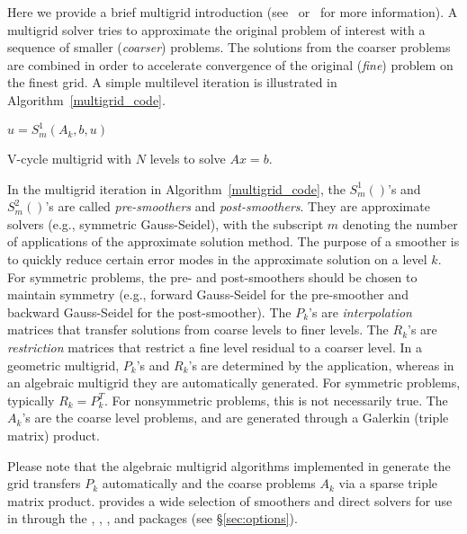 \label{sec:multigrid intro}
Here we provide a brief multigrid introduction (see~\cite{MGTutorial}
or~\cite{OwlBook} for more information). A multigrid solver tries to approximate
the original problem of interest with a sequence of smaller (\textit{coarser})
problems. The solutions from the coarser problems are combined in order to
accelerate convergence of the original (\textit{fine}) problem on the finest
grid. A simple multilevel iteration is illustrated in
Algorithm~\ref{multigrid_code}.

\begin{algorithm}
\centering
\begin{algorithmic}[0]
    \State $ u = S^{1}_m (A_k, b, u)$
        \State{}
      \EndIf
  \EndFunction
\end{algorithmic}
\caption{V-cycle multigrid with $N$ levels to solve $Ax=b$.}
\label{multigrid_code}
\end{algorithm}

In the multigrid iteration in Algorithm~\ref{multigrid_code}, the $S^{1}_m()$'s
and $S^{2}_m()$'s are called \textit{pre-smoothers} and \textit{post-smoothers}.
They are approximate solvers (e.g., symmetric Gauss-Seidel), with the subscript
$m$ denoting the number of applications of the approximate solution method. The
purpose of a smoother is to quickly reduce certain error modes in the
approximate solution on a level $k$. For symmetric problems, the pre-
and post-smoothers should be chosen to maintain symmetry (e.g., forward
Gauss-Seidel for the pre-smoother and backward Gauss-Seidel for the
post-smoother). The $P_k$'s are \textit{interpolation} matrices that transfer
solutions from coarse levels to finer levels. The $R_k$'s are
\textit{restriction} matrices that restrict a fine level residual to a coarser
level. In a geometric multigrid, $P_k$'s and $R_k$'s are determined
by the application, whereas in an algebraic multigrid they are automatically
generated. For symmetric problems, typically $R_k=P_k^T$. For nonsymmetric
problems, this is not necessarily true. The $A_k$'s are the coarse level
problems, and are generated through a Galerkin (triple matrix) product.

Please note that the algebraic multigrid algorithms implemented in \muelu{}
generate the grid transfers $P_k$ automatically and the coarse problems $A_k$
via a sparse triple matrix product. \trilinos{} provides a wide selection of
smoothers and direct solvers for use in \muelu through the \ifpack,
\ifpacktwo, \amesos, and \amesostwo packages (see \S\ref{sec:options}).

